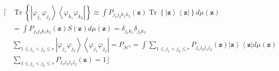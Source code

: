 \documentclass[aps,preprint]{revtex4}%
\begin{document}
\begin{align}
\lceil &  \operatorname*{Tr}\left\{  \left\vert \varphi_{j_{1}}\varphi_{j_{2}%
}\right\rangle \left\langle \varphi_{k_{1}}\varphi_{k_{2}}\right\vert
\right\}  \equiv\int P_{j_{1}j_{2}k_{1}k_{2}}\left(  \mathbf{z}\right)
\operatorname*{Tr}\left\{  \left\vert \mathbf{z}\right\rangle \left\langle
\mathbf{z}\right\vert \right\}  d\mu\left(  \mathbf{z}\right) \nonumber\\
&  =\int P_{j_{1}j_{2}k_{1}k_{2}}\left(  \mathbf{z}\right)  S\left(
\mathbf{z}\right)  d\mu\left(  \mathbf{z}\right)  =\delta_{j_{1}k_{1}}%
\delta_{j_{2}k_{2}}\nonumber\\
&  \sum_{1\leq j_{1}<j_{2}\leq r}\left\vert \varphi_{j_{1}}\varphi_{j_{2}%
}\right\rangle \left\langle \varphi_{j_{1}}\varphi_{j_{2}}\right\vert
=P_{\mathcal{H}^{2}}=\int\sum_{1\leq j_{1}<j_{2}\leq r}P_{j_{1}j_{2}j_{1}%
j_{2}}\left(  \mathbf{z}\right)  \left\vert \mathbf{z}\right\rangle
\left\langle \mathbf{z}\right\vert d\mu\left(  \mathbf{z}\right) \nonumber\\
&  \sum_{1\leq j_{1}<j_{2}\leq r}P_{j_{1}j_{2}j_{1}j_{2}}\left(
\mathbf{z}\right)  =1\rfloor
\end{align}
\end{document}
